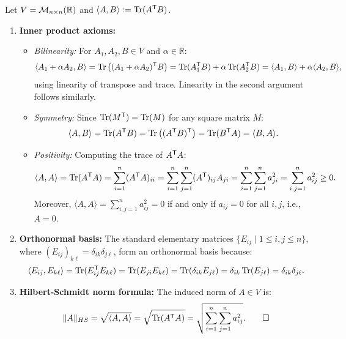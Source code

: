 \begin{exercisesolution}
\label{sol:frobenius_hilbert_schmidt_inner_product}
Let $V = \mathcal{M}_{n \times n}(\mathbb{R})$ and $\langle A, B \rangle := \operatorname{Tr}(A^{\mathsf{T}} B)$.
\begin{enumerate}[label=\textbf{(\alph*)}]
    \item \textbf{Inner product axioms:}
    \begin{itemize}
        \item \emph{Bilinearity:} For $A_1, A_2, B \in V$ and $\alpha \in \mathbb{R}$:
        \[
        \langle A_1 + \alpha A_2, B \rangle = \operatorname{Tr}\big((A_1 + \alpha A_2)^{\mathsf{T}} B\big) = \operatorname{Tr}(A_1^{\mathsf{T}} B) + \alpha \operatorname{Tr}(A_2^{\mathsf{T}} B) = \langle A_1, B \rangle + \alpha \langle A_2, B \rangle,
        \]
        using linearity of transpose and trace. Linearity in the second argument follows similarly.
        \item \emph{Symmetry:} Since $\operatorname{Tr}(M^{\mathsf{T}}) = \operatorname{Tr}(M)$ for any square matrix $M$:
        \[
        \langle A, B \rangle = \operatorname{Tr}(A^{\mathsf{T}} B) = \operatorname{Tr}\big((A^{\mathsf{T}} B)^{\mathsf{T}}\big) = \operatorname{Tr}(B^{\mathsf{T}} A) = \langle B, A \rangle.
        \]
        \item \emph{Positivity:} Computing the trace of $A^{\mathsf{T}} A$:
        \[
        \langle A, A \rangle = \operatorname{Tr}(A^{\mathsf{T}} A) = \sum_{i=1}^n (A^{\mathsf{T}} A)_{ii} = \sum_{i=1}^n \sum_{j=1}^n (A^{\mathsf{T}})_{ij} A_{ji} = \sum_{i=1}^n \sum_{j=1}^n a_{ji}^2 = \sum_{i,j=1}^n a_{ij}^2 \ge 0.
        \]
        Moreover, $\langle A, A \rangle = \sum_{i,j=1}^n a_{ij}^2 = 0$ if and only if $a_{ij} = 0$ for all $i,j$, i.e., $A = 0$.
    \end{itemize}

    \item \textbf{Orthonormal basis:}
    The standard elementary matrices $\{E_{ij} \mid 1 \le i, j \le n\}$, where $(E_{ij})_{k\ell} = \delta_{ik}\delta_{j\ell}$, form an orthonormal basis because:
    \[
    \langle E_{ij}, E_{k\ell} \rangle = \operatorname{Tr}(E_{ij}^{\mathsf{T}} E_{k\ell}) = \operatorname{Tr}(E_{ji} E_{k\ell}) = \operatorname{Tr}(\delta_{ik} E_{j\ell}) = \delta_{ik} \operatorname{Tr}(E_{j\ell}) = \delta_{ik} \delta_{j\ell}.
    \]

    \item \textbf{Hilbert-Schmidt norm formula:}
    The induced norm of $A \in V$ is:
    \[
    \|A\|_{HS} = \sqrt{\langle A, A \rangle} = \sqrt{\operatorname{Tr}(A^{\mathsf{T}} A)} = \sqrt{\sum_{i=1}^n \sum_{j=1}^n a_{ij}^2}. \qedhere
    \]
\end{enumerate}
\end{exercisesolution}

